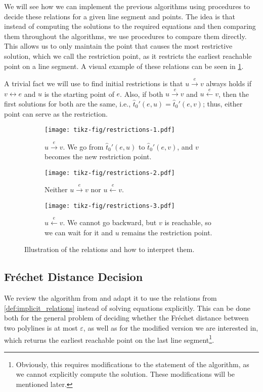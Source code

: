 We will see how we can implement the previous algorithms using procedures to decide these relations for a given line segment and points. The idea is that instead of computing the solutions to the required equations and then comparing them throughout the algorithms, we use procedures to compare them directly. This allows us to only maintain the point that causes the most restrictive solution, which we call the restriction point, as it restricts the earliest reachable point on a line segment. A visual example of these relations can be seen in \cref{fig:restrictions}.

A trivial fact we will use to find initial restrictions is that \(u \overset e\rightarrow v\) always holds if \(v \leftrightarrow e\) and \(u\) is the starting point of \(e\). Also, if both \(u \overset e\rightarrow v\) and \(u \overset e\leftarrow v\), then the first solutions for both are the same, i.e., \(\hat t_0'(e, u) = \hat t_0'(e,v)\); thus, either point can serve as the restriction.

\begin{figure}[ht]
  \centering
  \begin{subfigure}[t]{0.3\textwidth}
    \texttt{[image: tikz-fig/restrictions-1.pdf]}
    \caption{\(u \overset e\rightarrow v\). We go from \(\hat t_0'(e, u)\) to \(\hat t_0'(e, v)\), and \(v\) becomes the new restriction point.}
  \end{subfigure}
  \begin{subfigure}[t]{0.3\textwidth}
    \texttt{[image: tikz-fig/restrictions-2.pdf]}
    \caption{Neither \(u \overset e\rightarrow v\) nor \(u \overset e\leftarrow v\).}
  \end{subfigure}
  \begin{subfigure}[t]{0.3\textwidth}
    \texttt{[image: tikz-fig/restrictions-3.pdf]}
    \caption{\(u \overset e\leftarrow v\). We cannot go backward, but \(v\) is reachable, so we can wait for it and \(u\) remains the restriction point.}
  \end{subfigure}
  \caption{Illustration of the relations and how to interpret them.}
  \label{fig:restrictions}
\end{figure}

\subsection{Fréchet Distance Decision}\label{ssec:implicit_frechet_decision}
We review the algorithm from \citeauthor{computing_the_frechet_distance_between_two_polygonal_curves} and adapt it to use the relations from \cref{def:implicit_relations} instead of solving equations explicitly. This can be done both for the general problem of deciding whether the Fréchet distance between two polylines is at most \(\varepsilon\), as well as for the modified version we are interested in, which returns the earliest reachable point on the last line segment\footnote{Obviously, this requires modifications to the statement of the algorithm, as we cannot explicitly compute the solution. These modifications will be mentioned later.}.

